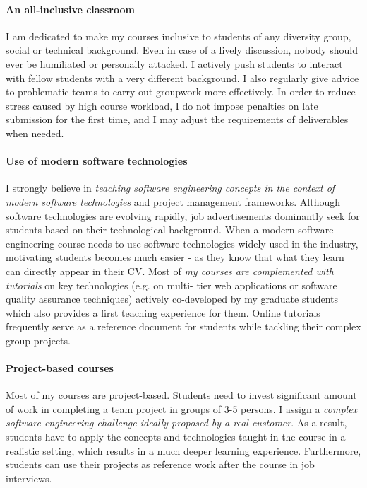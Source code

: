 \paragraph{An all-inclusive classroom}
I am dedicated to make my courses inclusive to students of any diversity group, social or technical background. Even in case of a lively discussion, nobody should ever be humiliated or personally attacked. I actively push students to interact with fellow students with a very different background. I also regularly give advice to problematic teams to carry out groupwork more effectively. In order to reduce stress caused by high course workload, I do not impose penalties on late submission for the first time, and I may adjust the requirements of deliverables when needed. 


\paragraph{Use of modern software technologies}
I strongly believe in \emph{teaching software engineering concepts in the context of modern software technologies} and 
project management frameworks. Although software technologies are evolving rapidly, job advertisements dominantly seek 
for students based on their technological background. When a modern software engineering course needs to use software 
technologies widely used in the industry, motivating students becomes much easier - as they know that what they learn can 
directly appear in their CV. Most of \emph{my courses are complemented with tutorials} on key technologies (e.g. on multi-
tier web applications or software quality assurance techniques) actively co-developed by my graduate students which also 
provides a first teaching experience for them. Online tutorials frequently serve as a reference document for students while 
tackling their complex group projects.

\paragraph{Project-based courses}
Most of my courses are project-based. Students need to invest significant amount of work in completing a team 
project in groups of 3-5 persons. I assign a \emph{complex software engineering challenge ideally proposed by a 
real customer}. As a result, students have to apply the concepts and technologies taught in the course in a realistic setting, 
which results in a much deeper learning experience. Furthermore, students can use their projects as reference work after 
the course in job interviews. 


